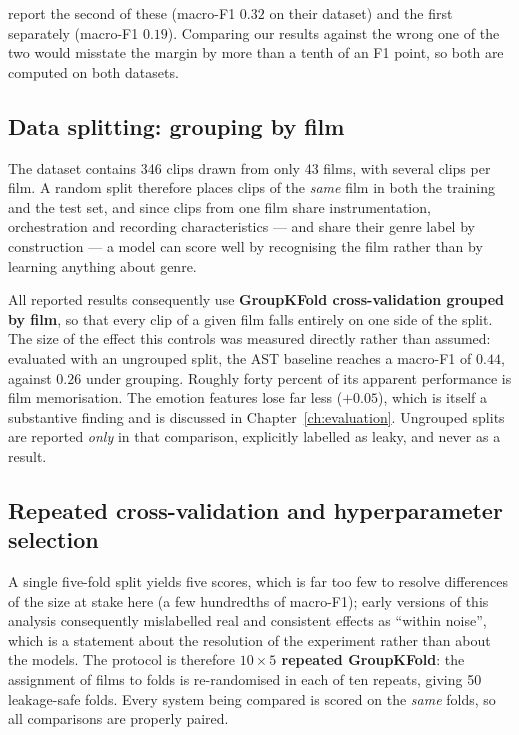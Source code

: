 \citet{ma2021computational} report the second of these (macro-F1 $0.32$ on their dataset)
and the first separately (macro-F1 $0.19$). Comparing our results against the wrong one of
the two would misstate the margin by more than a tenth of an F1 point, so both are
computed on both datasets.

\subsection{Data splitting: grouping by film}

The dataset contains 346 clips drawn from only 43 films, with several clips per film. A
random split therefore places clips of the \emph{same} film in both the training and the
test set, and since clips from one film share instrumentation, orchestration and
recording characteristics --- and share their genre label by construction --- a model can
score well by recognising the film rather than by learning anything about genre.

All reported results consequently use \textbf{GroupKFold cross-validation grouped by
film}, so that every clip of a given film falls entirely on one side of the split. The
size of the effect this controls was measured directly rather than assumed: evaluated
with an ungrouped split, the AST baseline reaches a macro-F1 of $0.44$, against $0.26$
under grouping. Roughly forty percent of its apparent performance is film memorisation.
The emotion features lose far less ($+0.05$), which is itself a substantive finding and is
discussed in Chapter~\ref{ch:evaluation}. Ungrouped splits are reported \emph{only} in
that comparison, explicitly labelled as leaky, and never as a result.

\subsection{Repeated cross-validation and hyperparameter selection}

A single five-fold split yields five scores, which is far too few to resolve differences
of the size at stake here (a few hundredths of macro-F1); early versions of this analysis
consequently mislabelled real and consistent effects as ``within noise'', which is a
statement about the resolution of the experiment rather than about the models. The
protocol is therefore \textbf{$10\times5$ repeated GroupKFold}: the assignment of films to
folds is re-randomised in each of ten repeats, giving 50 leakage-safe folds. Every system
being compared is scored on the \emph{same} folds, so all comparisons are properly paired.

